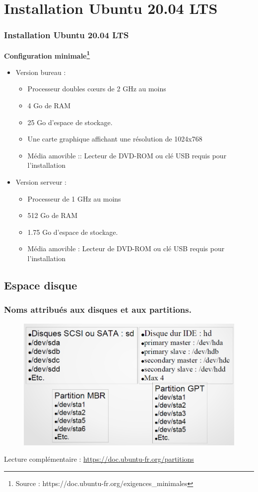 	\section{Installation Ubuntu 20.04 LTS}
	\begin{frame}[containsverbatim]
		\frametitle{Installation Ubuntu 20.04 LTS}
		\textbf{Configuration minimale\footnote{Source : https://doc.ubuntu-fr.org/exigences\_minimales}}
		\begin{itemize}
			\item Version bureau :
			\begin{itemize}
				\item Processeur doubles cœurs de 2 GHz au moins
				\item 4 Go de RAM
				\item 25 Go d'espace de stockage.
				\item Une carte graphique affichant une résolution de 1024x768
				\item Média amovible :: Lecteur de DVD-ROM ou clé USB requis pour l'installation 
			\end{itemize}
			\item Version serveur : 
			\begin{itemize}
				\item Processeur de 1 GHz au moins
				\item 512 Go de RAM
				\item 1.75 Go d'espace de stockage.
				\item Média amovible : Lecteur de DVD-ROM ou clé USB requis pour l'installation  
			\end{itemize}
		\end{itemize}
	\end{frame}
	
	\subsection{Espace disque}
	
	\begin{frame}
		\frametitle{Noms attribués aux disques et aux partitions.}
		\begin{figure}[!h]
			\centering
			\includegraphics[scale=0.4]{images/capture6}
		\end{figure}
	Lecture complémentaire : \url{https://doc.ubuntu-fr.org/partitions}
	\end{frame}
	
